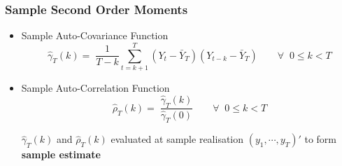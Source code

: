 \documentclass{beamer}
\begin{document}
	\begin{frame}
		\frametitle{Sample Second Order Moments }
		\begin{itemize}
			\item[]	\begin{mydef*}[width=13cm]{Sample Auto-Covariance Function} 
				\begin{equation*}
				\hat{\gamma}_T(k)=\; \frac{1}{T-k}\sum_{t=k+1}^{T}\left( Y_{t}-\bar{Y}_T
				\right)\left( Y_{t-k}-\bar{Y}_T\right) \qquad \forall \;\; 0 \leq k <T \label{sample autocv}
				\end{equation*} \end{mydef*}
			\pause
			\vspace{15pt}
			\item[]	\begin{mydef*}[width=13cm]{Sample Auto-Correlation Function} 
				\begin{equation*}
				\hat{\rho}_T(k)=\; \frac{\hat{\gamma}_T(k)}{\hat{\gamma}_T(0)}  \qquad \forall \;\; 0 \leq k <T   \label{sample autocorr}
				\end{equation*} \end{mydef*}
			\pause
			\vspace{25pt}  $\hat{\gamma}_T(k)$ and $\hat{\rho}_T(k)$  evaluated at  sample realisation $(y_1,\cdots,y_T)'$ to form  \textbf{sample estimate}
		\end{itemize}	\end{frame}
	
\end{document}

